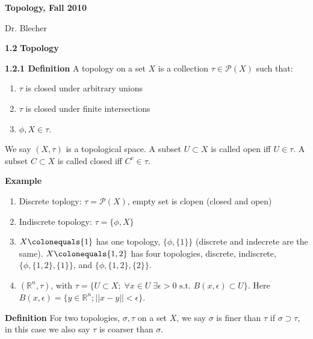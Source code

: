 \documentclass[12pt]{article}
\newcommand{\pset}[1]{ \mathcal{P}(#1) }
\newcommand{\st}[0]{ \textrm{ s.t. } }
\newcommand{ \defeq }[0] { \colonequals }
\newcommand{\reals}[0] { \mathbb{R}}
\newcommand{\eps}[0] {  \epsilon }
\begin{document}
\begin{center} 
 { \bf Topology, Fall 2010} \end{center}\begin{center} 
 Dr. Blecher\end{center}\begin{flushleft}
{\bf 1.2 }{\bf Topology }\end{flushleft}
\begin{flushleft} 
 { \bf 1.2.1 Definition }A topology on a set $X$ is a collection $\tau \in \pset{X}$ such that:\begin{enumerate}[i]
\item
                $\tau$ is closed under arbitrary unions
            \item
                $\tau$ is closed under finite intersections
            \item
                $\phi, X \in \tau$.
            \end{enumerate}We say $(X, \tau)$ is a topological space. A subset $U \subset X$ is called open iff $U \in \tau$. A subset $C \subset X$ is called closed iff $C^c \in \tau$.\end{flushleft}\begin{flushleft} 
 { \bf Example }\begin{enumerate}[i]
\item
                Discrete toplogy: $\tau = \pset{X}$, empty set is clopen (closed and open)
            \item
                Indiscrete topology: $\tau = \{ \phi, X \}$
            \item
                $X \defeq \{ 1 \}$ has one topology, $\{ \phi, \{ 1\} \}$ (discrete and indecrete are the same). $X \defeq \{1, 2\}$ has four topologies, discrete, indiscrete, $\{ \phi , \{1,2\}, \{1\}\}$, and $\{ \phi, \{1,2\}, \{2\}\}$.
            \item
                $(\reals^n, \tau)$, with $\tau = \{ U \subset X; \; \forall x \in U \; \exists \eps>0 \st B(x,\eps) \subset U \}$. Here $B(x, \eps) = \{ y \in \reals^n; ||x-y|| < \eps \}$.
            \end{enumerate}\end{flushleft}\begin{flushleft} 
 { \bf Definition }For two topologies, $\sigma, \tau$ on a set $X$, we say $\sigma$ is finer than $\tau$ if $\sigma \supset \tau$, in this case we also say $\tau$ is coarser than $\sigma$.\end{flushleft}\begin{flushleft} 

\end{flushleft}
\end{document}
